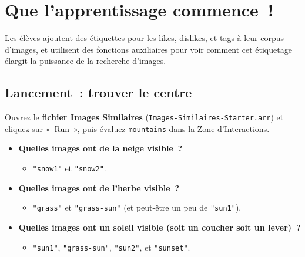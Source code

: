\documentclass[12pt,a4paper]{article}
\begin{document}
\newpage

\section{Que l'apprentissage commence~!}

\begin{overviewbox}
  Les élèves ajoutent des étiquettes pour les likes, dislikes, et tags à leur corpus d'images, et utilisent des fonctions auxiliaires pour voir comment cet étiquetage élargit la puissance de la recherche d'images.
\end{overviewbox}

\subsection{Lancement~: trouver le centre}

\begin{activitybox}
  Ouvrez le \textbf{fichier Images Similaires} (\texttt{Images\allowbreak-Similaires\allowbreak-Starter.arr}) et cliquez sur «~Run~», puis évaluez \texttt{mountains} dans la Zone d'Interactions.

  \begin{itemize}
    \item \textbf{Quelles images ont de la \textbf{neige} visible~?}
    \begin{itemize}
      \item \texttt{"snow1"} et \texttt{"snow2"}.
    \end{itemize}
    \item \textbf{Quelles images ont de l'\textbf{herbe} visible~?}
    \begin{itemize}
      \item \texttt{"grass"} et \texttt{"grass\allowbreak-sun"} (et peut-être un peu de \texttt{"sun1"}).
    \end{itemize}
    \item \textbf{Quelles images ont un \textbf{soleil} visible (soit un coucher soit un lever)~?}
    \begin{itemize}
      \item \texttt{"sun1"}, \texttt{"grass\allowbreak-sun"}, \texttt{"sun2"}, et \texttt{"sunset"}.
    \end{itemize}
  \end{itemize}
\end{activitybox}
\end{document}
